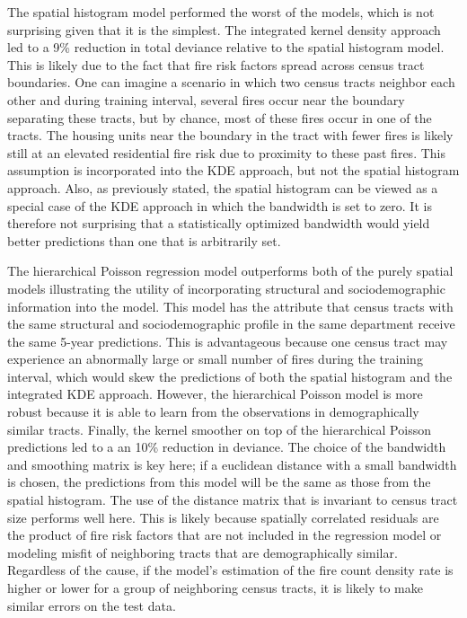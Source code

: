 \documentclass{svjour3}
\begin{document}
    
    The spatial histogram model performed the worst of the models, which is not surprising given that it is the simplest. The integrated kernel density approach led to a 9\% reduction in total deviance relative to the spatial histogram model. This is likely due to the fact that fire risk factors spread across census tract boundaries. One can imagine a scenario in which two census tracts neighbor each other and during training interval, several fires occur near the boundary separating these tracts, but by chance, most of these fires occur in one of the tracts. The housing units near the boundary in the tract with fewer fires is likely still at an elevated residential fire risk due to proximity to these past fires. This assumption is incorporated into the KDE approach, but not the spatial histogram approach. Also, as previously stated, the spatial histogram can be viewed as a special case of the KDE approach in which the bandwidth is set to zero. It is therefore not surprising that a statistically optimized bandwidth would yield better predictions than one that is arbitrarily set. 
    
    The hierarchical Poisson regression model outperforms both of the purely spatial models illustrating the utility of incorporating structural and sociodemographic information into the model. This model has the attribute that census tracts with the same structural and sociodemographic profile in the same department receive the same 5-year predictions. This is advantageous because one census tract may experience an abnormally large or small number of fires during the training interval, which would skew the predictions of both the spatial histogram and the integrated KDE approach. However, the hierarchical Poisson model is more robust because it is able to learn from the observations in demographically similar tracts. Finally, the kernel smoother on top of the hierarchical Poisson predictions led to a an 10\% reduction in deviance. The choice of the bandwidth and smoothing matrix is key here; if a euclidean distance with a small bandwidth is chosen, the predictions from this model will be the same as those from the spatial histogram. The use of the distance matrix that is invariant to census tract size performs well here. This is likely because spatially correlated residuals are the product of fire risk factors that are not included in the regression model or modeling misfit of neighboring tracts that are demographically similar. Regardless of the cause, if the model's estimation of the fire count density rate is higher or lower for a group of neighboring census tracts, it is likely to make similar errors on the test data. 
    
\end{document}

